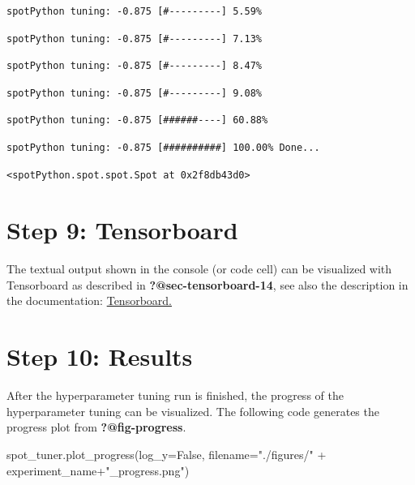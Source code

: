 \documentclass[
  letterpaper,
  DIV=11,
  numbers=noendperiod]{scrreprt}
\newenvironment{Shaded}{\begin{snugshade}}{\end{snugshade}}
\newcommand{\NormalTok}[1]{\textcolor[rgb]{0.00,0.23,0.31}{#1}}
\newcommand{\OperatorTok}[1]{\textcolor[rgb]{0.37,0.37,0.37}{#1}}
\newcommand{\StringTok}[1]{\textcolor[rgb]{0.13,0.47,0.30}{#1}}
\newcommand{\VariableTok}[1]{\textcolor[rgb]{0.07,0.07,0.07}{#1}}
\begin{document}
\begin{verbatim}
spotPython tuning: -0.875 [#---------] 5.59% 
\end{verbatim}

\begin{verbatim}
spotPython tuning: -0.875 [#---------] 7.13% 
\end{verbatim}

\begin{verbatim}
spotPython tuning: -0.875 [#---------] 8.47% 
\end{verbatim}

\begin{verbatim}
spotPython tuning: -0.875 [#---------] 9.08% 
\end{verbatim}

\begin{verbatim}
spotPython tuning: -0.875 [######----] 60.88% 
\end{verbatim}

\begin{verbatim}
spotPython tuning: -0.875 [##########] 100.00% Done...
\end{verbatim}

\begin{verbatim}
<spotPython.spot.spot.Spot at 0x2f8db43d0>
\end{verbatim}

\hypertarget{sec-tensorboard-18}{%
\section{Step 9: Tensorboard}\label{sec-tensorboard-18}}

The textual output shown in the console (or code cell) can be visualized
with Tensorboard as described in \textbf{?@sec-tensorboard-14}, see also
the description in the documentation:
\href{https://sequential-parameter-optimization.github.io/spotPython/14_spot_ray_hpt_torch_cifar10.html\#sec-tensorboard-14}{Tensorboard.}

\hypertarget{sec-results-tuning-18}{%
\section{Step 10: Results}\label{sec-results-tuning-18}}

After the hyperparameter tuning run is finished, the progress of the
hyperparameter tuning can be visualized. The following code generates
the progress plot from \textbf{?@fig-progress}.

\begin{Shaded}
\begin{Highlighting}[]
\NormalTok{spot\_tuner.plot\_progress(log\_y}\OperatorTok{=}\VariableTok{False}\NormalTok{,}
\NormalTok{    filename}\OperatorTok{=}\StringTok{"./figures/"} \OperatorTok{+}\NormalTok{ experiment\_name}\OperatorTok{+}\StringTok{"\_progress.png"}\NormalTok{)}
\end{Highlighting}
\end{Shaded}
\end{document}
